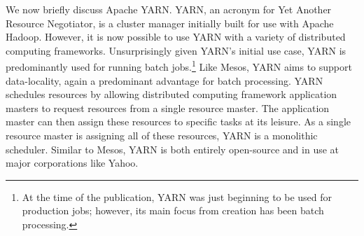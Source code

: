 We now briefly discuss Apache YARN. YARN, an acronym for Yet Another
Resource Negotiator, is a cluster manager initially built for use with Apache
Hadoop.\cite[pg. 1]{yarn} However, it is now possible to use YARN with a variety
of distributed computing frameworks. Unsurprisingly given YARN's initial use
case, YARN is predominantly used for running batch jobs.\footnote{At the time of
the publication, YARN was just beginning to be used for production jobs;
however, its main focus from creation has been batch processing.\cite[pg.
11]{yarn}} Like Mesos, YARN aims to support data-locality,
again a predominant advantage for batch processing.\cite[pg. 3]{yarn} YARN
schedules resources by allowing distributed computing framework application
masters to request resources from a single resource master.\cite[pg. 5]{yarn}
The application master can then assign these resources to specific tasks at its
leisure. As a single resource master is assigning all of these resources, YARN is a
monolithic scheduler. Similar to Mesos, YARN is both entirely open-source and in use
at major corporations like Yahoo.\cite[pg. 9]{yarn}


